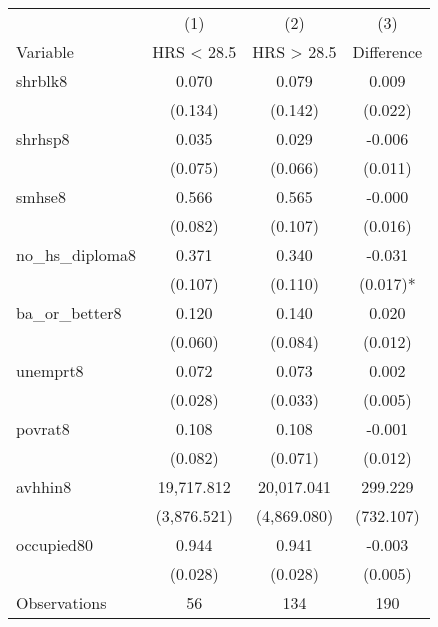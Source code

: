 \begin{tabular}{lccc}
\hline\hline
 & (1) & (2) & (3)   \\
Variable & HRS < 28.5 & HRS > 28.5 & Difference   \\
\hline
shrblk8&0.070&0.079&0.009\\
&(0.134)&(0.142)&(0.022)\\
shrhsp8&0.035&0.029&-0.006\\
&(0.075)&(0.066)&(0.011)\\
smhse8&0.566&0.565&-0.000\\
&(0.082)&(0.107)&(0.016)\\
no\_hs\_diploma8&0.371&0.340&-0.031\\
&(0.107)&(0.110)&(0.017)*\\
ba\_or\_better8&0.120&0.140&0.020\\
&(0.060)&(0.084)&(0.012)\\
unemprt8&0.072&0.073&0.002\\
&(0.028)&(0.033)&(0.005)\\
povrat8&0.108&0.108&-0.001\\
&(0.082)&(0.071)&(0.012)\\
avhhin8&19,717.812&20,017.041&299.229\\
&(3,876.521)&(4,869.080)&(732.107)\\
occupied80&0.944&0.941&-0.003\\
&(0.028)&(0.028)&(0.005)\\
\hline
Observations & 56 & 134 & 190  \\
\hline\hline
\end{tabular}
